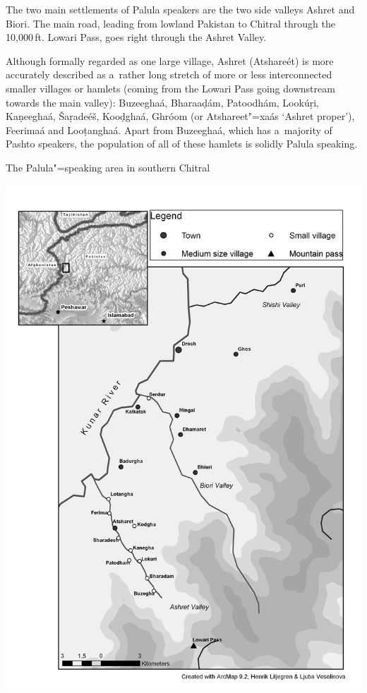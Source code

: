 The two main settlements of Palula speakers are the two side valleys Ashret and Biori. The main road, leading from lowland Pakistan to Chitral through the 10,000\,ft. Lowari Pass, goes right through the Ashret Valley. 


Although formally regarded as one large village, Ashret (Atshareét) is more accurately described as a~rather long stretch of more or less interconnected smaller villages or hamlets (coming from the Lowari Pass going downstream towards the main valley): Buzeeghaá, Bharaaḍám, Patoodhám, Lookúṛi, Kaṇeeghaá, Šaṛadeéš, Kooḍghaá, Ghróom (or Atshareet"=xaás `Ashret proper'), Feerimaá and Looṭanghaá. Apart from Buzeeghaá, which has a~majority of Pashto speakers, the population of all of these hamlets is solidly Palula speaking. 

\begin{mapfigure}[p!]
\caption{The Palula"=speaking area in southern Chitral}
\includegraphics[width=\textwidth]{figures/ch1map1.png}
\label{map:1-1}
\end{mapfigure}



